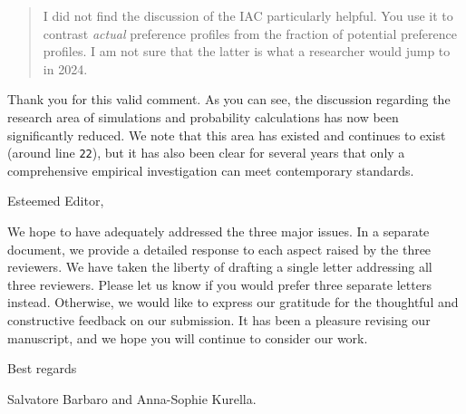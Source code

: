 \documentclass[a4paper, 12pt]{scrartcl}
\begin{document}
\begin{quotation}
I did not find the discussion of the IAC particularly helpful. You use it to contrast \textit{actual}
preference profiles from the fraction of potential preference profiles. I am not sure that the
latter is what a researcher would jump to in 2024.
\end{quotation}

Thank you for this valid comment. As you can see, the discussion regarding the research area of simulations and probability calculations has now been significantly reduced. We note that this area has existed and continues to exist (around line \texttt{22}), but it has also been clear for several years that only a comprehensive empirical investigation can meet contemporary standards.

\hspace{0.8cm}

Esteemed Editor, 

We hope to have adequately addressed the three major issues. In a separate document, we provide a detailed response to each aspect raised by the three reviewers. We have taken the liberty of drafting a single letter addressing all three reviewers. Please let us know if you would prefer three separate letters instead. Otherwise, we would like to express our gratitude for the thoughtful and constructive feedback on our submission. It has been a pleasure revising our manuscript, and we hope you will continue to consider our work. 


Best regards

\hspace{.6cm}

Salvatore Barbaro and Anna-Sophie Kurella.

\newpage



\end{document}
